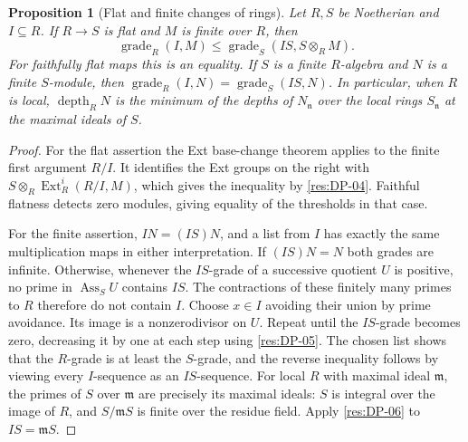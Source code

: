 \documentclass[11pt,oneside,openany]{book}
\newtheorem{proposition}[theorem]{Proposition}
\theoremstyle{definition}
\theoremstyle{remark}
\begin{document}
\begin{proposition}[Flat and finite changes of rings]\label{res:DP-08}
Let $R,S$ be Noetherian and $I\subseteq R$.
If $R\to S$ is flat and $M$ is finite over $R$, then
\[
 \operatorname{grade}_R(I,M)\le
 \operatorname{grade}_S(IS,S\otimes_R M).
\]
For faithfully flat maps this is an equality.
If $S$ is a finite $R$-algebra and $N$ is a finite $S$-module, then
$\operatorname{grade}_R(I,N)=\operatorname{grade}_S(IS,N)$.
In particular, when $R$ is local, $\operatorname{depth}_R N$ is
the minimum of the depths of $N_{\mathfrak n}$ over the local rings
$S_{\mathfrak n}$ at the maximal ideals of $S$.
\end{proposition}
\begin{proof}
For the flat assertion the Ext base-change theorem
\cite[Theorem ALG-10-C03-S03]{p103} applies to the finite first
argument $R/I$. It identifies the Ext groups on the right with
$S\otimes_R\operatorname{Ext}_R^i(R/I,M)$, which gives the
inequality by \ref{res:DP-04}. Faithful flatness detects zero
modules, giving equality of the thresholds in that case.

For the finite assertion, $IN=(IS)N$, and a list from $I$ has
exactly the same multiplication maps in either interpretation.
If $(IS)N=N$ both grades are infinite. Otherwise, whenever the
$IS$-grade of a successive quotient $U$ is positive, no prime in
$\operatorname{Ass}_S U$ contains $IS$. The contractions of these
finitely many primes to $R$ therefore do not contain $I$. Choose
$x\in I$ avoiding their union by prime avoidance. Its image is a
nonzerodivisor on $U$. Repeat until the $IS$-grade becomes zero,
decreasing it by one at each step using \ref{res:DP-05}. The chosen
list shows that the $R$-grade is at least the $S$-grade, and the
reverse inequality follows by viewing every $I$-sequence as an
$IS$-sequence. For local $R$ with maximal ideal $\mathfrak m$,
the primes of $S$ over $\mathfrak m$ are precisely its maximal ideals:
$S$ is integral over the image of $R$, and $S/\mathfrak m S$ is
finite over the residue field. Apply \ref{res:DP-06} to $IS=\mathfrak m S$.
\end{proof}
\end{document}
